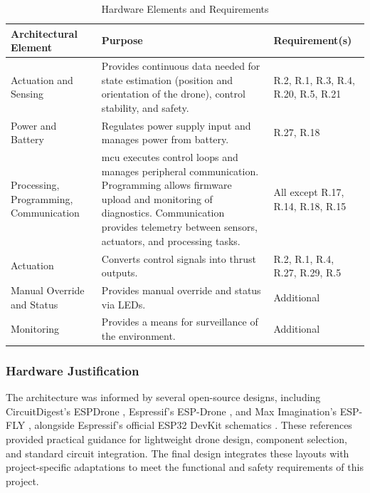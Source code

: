 \begin{table}[H]
\centering
\caption{Hardware Elements and Requirements}
\label{tab:hardware-arch}
\begin{tabular}{|m{}|m{}|m{}|}
\hline
\rowcolor{gray!15}
\textbf{Architectural Element} & \textbf{Purpose} & \textbf{Requirement(s)} \\
\hline
Actuation and Sensing & Provides continuous data needed for state estimation (position and orientation of the drone), control stability, and safety. & R.2, R.1, R.3, R.4, R.20, R.5, R.21 \\
\hline
Power and Battery  & Regulates power supply input and manages power from battery. & R.27, R.18 \\
\hline
Processing, Programming, Communication & \gls{mcu} executes control loops and manages peripheral communication.
Programming allows firmware upload and monitoring of diagnostics. Communication provides telemetry between sensors, actuators, and processing tasks. & All except R.17, R.14, R.18, R.15 \\
\hline
Actuation & Converts control signals into thrust outputs. & R.2, R.1, R.4, R.27, R.29, R.5 \\
\hline
Manual Override and Status & Provides manual override and status via LEDs. & Additional \\
\hline
Monitoring & Provides a means for surveillance of the environment. & Additional \\
\hline
\end{tabular}
\end{table}

\subsubsection{Hardware Justification}

The architecture was informed by several open-source designs, including CircuitDigest’s ESPDrone \cite{espdrone_circuitdigest}, Espressif’s ESP-Drone \cite{espdrone_espressif}, and Max Imagination’s ESP-FLY \cite{maximagination}, alongside Espressif’s official ESP32 DevKit schematics \cite{espressif_devkits}. These references provided practical guidance for lightweight drone design, component selection, and standard circuit integration. The final design integrates these layouts with project-specific adaptations to meet the functional and safety requirements of this project.

